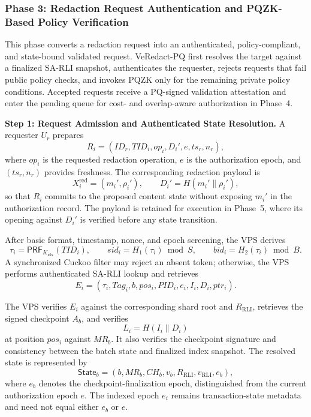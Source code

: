 \documentclass[lettersize,journal]{IEEEtran}
\begin{document}
    
   \subsubsection*{\textbf{Phase 3: Redaction Request Authentication and
PQZK-Based Policy Verification}}

This phase converts a redaction request into an authenticated,
policy-compliant, and state-bound validated request. VeRedact-PQ first
resolves the target against a finalized SA-RLI snapshot, authenticates
the requester, rejects requests that fail public policy checks, and
invokes PQZK only for the remaining private policy conditions. Accepted
requests receive a PQ-signed validation attestation and enter the pending
queue for cost- and overlap-aware authorization in Phase~4.

\medskip
\noindent\textbf{Step 1: Request Admission and Authenticated State
Resolution.}
A requester $U_r$ prepares
\begin{equation}
R_i=(ID_r,TID_i,op_i,D_i',e,ts_r,n_r),
\end{equation}
where $op_i$ is the requested redaction operation, $e$ is the
authorization epoch, and $(ts_r,n_r)$ provides freshness. The
corresponding redaction payload is
\begin{equation}
X_i^{\mathrm{red}}=(m_i',\rho_i'),
\qquad
D_i'=H(m_i'\parallel\rho_i'),
\end{equation}
so that $R_i$ commits to the proposed content state without exposing
$m_i'$ in the authorization record. The payload is retained for
execution in Phase~5, where its opening against $D_i'$ is verified
before any state transition.

After basic format, timestamp, nonce, and epoch screening, the VPS
derives
\begin{equation}
\tau_i=\mathsf{PRF}_{K_{\mathrm{idx}}}(TID_i),
\qquad
sid_i=H_1(\tau_i)\bmod S,
\qquad
bid_i=H_2(\tau_i)\bmod B.
\end{equation}
A synchronized Cuckoo filter may reject an absent token; otherwise, the
VPS performs authenticated SA-RLI lookup and retrieves
\begin{equation}
E_i=(\tau_i,Tag_i,b,pos_i,PID_i,e_i,I_i,D_i,ptr_i).
\end{equation}

The VPS verifies $E_i$ against the corresponding shard root and
$R_{\mathrm{RLI}}$, retrieves the signed checkpoint $A_b$, and verifies
\begin{equation}
L_i=H(I_i\parallel D_i)
\end{equation}
at position $pos_i$ against $MR_b$. It also verifies the checkpoint
signature and consistency between the batch state and finalized index
snapshot. The resolved state is represented by
\begin{equation}
\mathsf{State}_b=
(b,MR_b,CH_b,v_b,R_{\mathrm{RLI}},v_{\mathrm{RLI}},e_b),
\end{equation}
where $e_b$ denotes the checkpoint-finalization epoch, distinguished
from the current authorization epoch $e$. The indexed epoch $e_i$
remains transaction-state metadata and need not equal either $e_b$ or
$e$.
\end{document}
